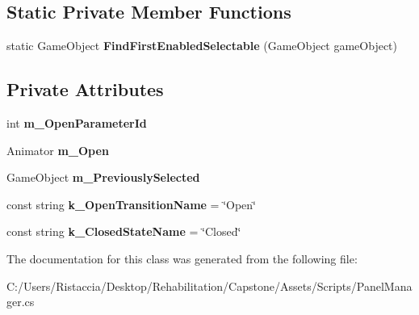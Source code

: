 \subsection*{Static Private Member Functions}
\begin{DoxyCompactItemize}
\item 
\mbox{\label{class_panel_manager_a6888147d2901d2ca396b36425d86bef7}} 
static Game\+Object {\bfseries Find\+First\+Enabled\+Selectable} (Game\+Object game\+Object)
\end{DoxyCompactItemize}
\subsection*{Private Attributes}
\begin{DoxyCompactItemize}
\item 
\mbox{\label{class_panel_manager_a13ee8a91cfca1f87db19c9d3df0a63a6}} 
int {\bfseries m\+\_\+\+Open\+Parameter\+Id}
\item 
\mbox{\label{class_panel_manager_a7d52d219fe1f09d4603271dd15038e2a}} 
Animator {\bfseries m\+\_\+\+Open}
\item 
\mbox{\label{class_panel_manager_a9322919706b76d90c5315b3eda32a7d3}} 
Game\+Object {\bfseries m\+\_\+\+Previously\+Selected}
\item 
\mbox{\label{class_panel_manager_ac52d3f0df7eaec10c7f888c2b1a476ae}} 
const string {\bfseries k\+\_\+\+Open\+Transition\+Name} = \char`\"{}Open\char`\"{}
\item 
\mbox{\label{class_panel_manager_a392ee6f7309e807bb782ab54aa3818be}} 
const string {\bfseries k\+\_\+\+Closed\+State\+Name} = \char`\"{}Closed\char`\"{}
\end{DoxyCompactItemize}


The documentation for this class was generated from the following file\+:\begin{DoxyCompactItemize}
\item 
C\+:/\+Users/\+Ristaccia/\+Desktop/\+Rehabilitation/\+Capstone/\+Assets/\+Scripts/Panel\+Manager.\+cs\end{DoxyCompactItemize}
